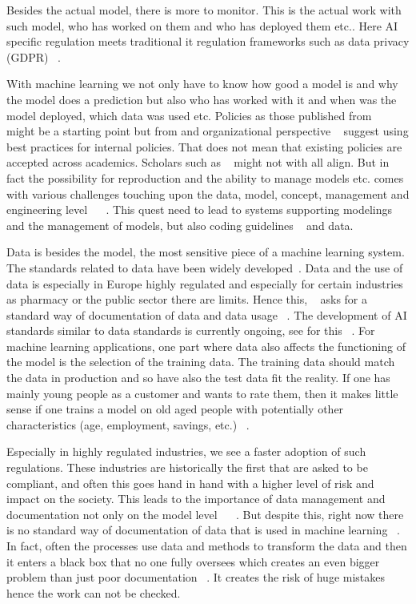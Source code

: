 \documentclass[jou,apacite]{apa6}
\begin{document}
Besides the actual model, there is more to monitor. This is the actual work with such model, who has worked on them and who has deployed them etc.. Here AI specific regulation meets traditional it regulation frameworks such as data privacy (GDPR) ~\cite{tankard2016gdpr}. 

With machine learning we not only have to know how good a model is and why the model does a prediction but also who has worked with it and when was the model deployed, which data was used etc. Policies as those published from ~\cite{goodman2017european} might be a starting point but from and organizational perspective ~\cite{alsheiabni2020winning} suggest using best practices for internal policies. That does not mean that existing policies are accepted across academics. Scholars such as ~\cite{mishra2020measurement} might not with all align. But in fact the possibility for reproduction and the ability to manage models etc. comes with various challenges touching upon the data, model, concept, management and engineering level ~\cite{schelter2018automating} ~\cite{schn19}. This quest need to lead to systems supporting modelings and the management of models, but also coding guidelines ~\cite{stoica2017berkeley} and data. \par

Data is besides the model, the most sensitive piece of a machine learning system. The standards related to data have been widely developed~\cite{mosley2010dama}. Data and the use of data is especially in Europe highly regulated and especially for certain industries as pharmacy or the public sector there are limits. Hence this, ~\cite{gebru2018datasheets} asks for a standard way of documentation of data and data usage ~\cite{bender2018data}. The development of AI standards similar to data standards is currently ongoing, see for this ~\cite{cihon2019standards}. For machine learning applications, one part where data also affects the functioning of the model is the selection of the training data. The training data should match the data in production and so have also the test data fit the reality. If one has mainly young people as a customer and wants to rate them, then it makes little sense if one trains a model on old aged people with potentially other characteristics (age, employment, savings, etc.) ~\cite{gebru2018datasheets}.\par

Especially in highly regulated industries, we see a faster adoption of such regulations. These industries are historically the first that are asked to be compliant, and often this goes hand in hand with a higher level of risk and impact on the society. This leads to the importance of data management and documentation not only on the model level ~\cite{garvie2016perpetual} ~\cite{mann2016hiring}. But despite this, right now there is no standard way of documentation of data that is used in machine learning ~\cite{thelisson2017regulatory}. In fact, often the processes use data and methods to transform the data and then it enters a black box that no one fully oversees which creates an even bigger problem than just poor documentation ~\cite{gebru2018datasheets}. It creates the risk of huge mistakes hence the work can not be checked.\par
\end{document}
